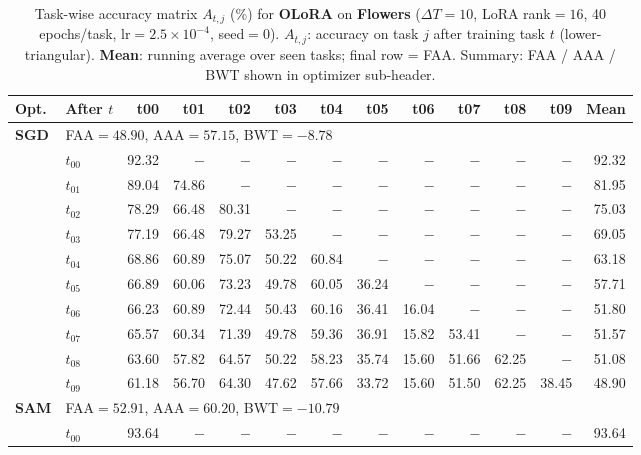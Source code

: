 \begin{table}[ht]
\centering
\caption{%
  Task-wise accuracy matrix $A_{t,j}$ (\%) for \textbf{OLoRA} on \textbf{Flowers}
  ($\Delta T=10$, LoRA rank$=16$, 40 epochs/task, lr$=2.5\times10^{-4}$, seed$=0$).
  $A_{t,j}$: accuracy on task $j$ after training task $t$ (lower-triangular).
  \textbf{Mean}: running average over seen tasks; final row = FAA.
  Summary: FAA / AAA / BWT shown in optimizer sub-header.
}
\label{tab:raw_olora_flowers}
\setlength{\tabcolsep}{2.8pt}
\renewcommand{\arraystretch}{0.88}
\scriptsize
\begin{tabular}{@{}l l r r r r r r r r r r r@{}}
\toprule
\textbf{Opt.} & \textbf{After $t$} & \textbf{t00} & \textbf{t01} & \textbf{t02} & \textbf{t03} & \textbf{t04} & \textbf{t05} & \textbf{t06} & \textbf{t07} & \textbf{t08} & \textbf{t09} & \textbf{Mean} \\
\midrule
\multirow{11}{*}{\textbf{SGD}} & \multicolumn{12}{l}{\quad\small FAA$=48.90$,\; AAA$=57.15$,\; BWT$=-8.78$} \\
 & $t_{00}$ & 92.32 & $-$ & $-$ & $-$ & $-$ & $-$ & $-$ & $-$ & $-$ & $-$ & 92.32 \\
 & $t_{01}$ & 89.04 & 74.86 & $-$ & $-$ & $-$ & $-$ & $-$ & $-$ & $-$ & $-$ & 81.95 \\
 & $t_{02}$ & 78.29 & 66.48 & 80.31 & $-$ & $-$ & $-$ & $-$ & $-$ & $-$ & $-$ & 75.03 \\
 & $t_{03}$ & 77.19 & 66.48 & 79.27 & 53.25 & $-$ & $-$ & $-$ & $-$ & $-$ & $-$ & 69.05 \\
 & $t_{04}$ & 68.86 & 60.89 & 75.07 & 50.22 & 60.84 & $-$ & $-$ & $-$ & $-$ & $-$ & 63.18 \\
 & $t_{05}$ & 66.89 & 60.06 & 73.23 & 49.78 & 60.05 & 36.24 & $-$ & $-$ & $-$ & $-$ & 57.71 \\
 & $t_{06}$ & 66.23 & 60.89 & 72.44 & 50.43 & 60.16 & 36.41 & 16.04 & $-$ & $-$ & $-$ & 51.80 \\
 & $t_{07}$ & 65.57 & 60.34 & 71.39 & 49.78 & 59.36 & 36.91 & 15.82 & 53.41 & $-$ & $-$ & 51.57 \\
 & $t_{08}$ & 63.60 & 57.82 & 64.57 & 50.22 & 58.23 & 35.74 & 15.60 & 51.66 & 62.25 & $-$ & 51.08 \\
 & $t_{09}$ & 61.18 & 56.70 & 64.30 & 47.62 & 57.66 & 33.72 & 15.60 & 51.50 & 62.25 & 38.45 & 48.90 \\
\midrule
\multirow{11}{*}{\textbf{SAM}} & \multicolumn{12}{l}{\quad\small FAA$=52.91$,\; AAA$=60.20$,\; BWT$=-10.79$} \\
 & $t_{00}$ & 93.64 & $-$ & $-$ & $-$ & $-$ & $-$ & $-$ & $-$ & $-$ & $-$ & 93.64 \\

\end{tabular}
\end{table}
